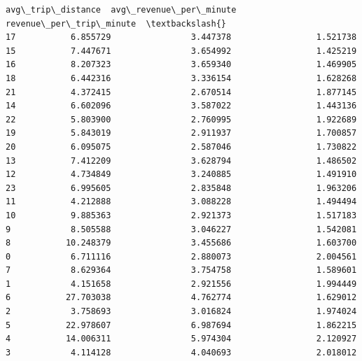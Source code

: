 \documentclass[11pt]{article}
\begin{document}
\begin{Verbatim}[commandchars=\\\{\}]
    avg\_trip\_distance  avg\_revenue\_per\_minute  revenue\_per\_trip\_minute  \textbackslash{}
17           6.855729                3.447378                 1.521738
15           7.447671                3.654992                 1.425219
16           8.207323                3.659340                 1.469905
18           6.442316                3.336154                 1.628268
21           4.372415                2.670514                 1.877145
14           6.602096                3.587022                 1.443136
22           5.803900                2.760995                 1.922689
19           5.843019                2.911937                 1.700857
20           6.095075                2.587046                 1.730822
13           7.412209                3.628794                 1.486502
12           4.734849                3.240885                 1.491910
23           6.995605                2.835848                 1.963206
11           4.212888                3.088228                 1.494494
10           9.885363                2.921373                 1.517183
9            8.505588                3.046227                 1.542081
8           10.248379                3.455686                 1.603700
0            6.711116                2.880073                 2.004561
7            8.629364                3.754758                 1.589601
1            4.151658                2.921556                 1.994449
6           27.703038                4.762774                 1.629012
2            3.758693                3.016824                 1.974024
5           22.978607                6.987694                 1.862215
4           14.006311                5.974304                 2.120927
3            4.114128                4.040693                 2.018012


\end{Verbatim}
\end{document}
